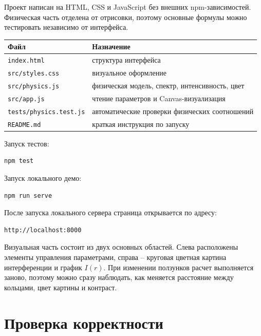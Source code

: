 \documentclass[12pt,a4paper]{article}
\begin{document}
Проект написан на HTML, CSS и JavaScript без внешних npm-зависимостей. Физическая часть отделена от
отрисовки, поэтому основные формулы можно тестировать независимо от интерфейса.

\begin{table}[h]
\centering
\begin{tabular}{ll}
\toprule
Файл & Назначение \\
\midrule
\texttt{index.html} & структура интерфейса \\
\texttt{src/styles.css} & визуальное оформление \\
\texttt{src/physics.js} & физическая модель, спектр, интенсивность, цвет \\
\texttt{src/app.js} & чтение параметров и Canvas-визуализация \\
\texttt{tests/physics.test.js} & автоматические проверки физических соотношений \\
\texttt{README.md} & краткая инструкция по запуску \\
\bottomrule
\end{tabular}
\end{table}

Запуск тестов:
\begin{lstlisting}
npm test
\end{lstlisting}

Запуск локального демо:
\begin{lstlisting}
npm run serve
\end{lstlisting}

После запуска локального сервера страница открывается по адресу:
\begin{lstlisting}
http://localhost:8000
\end{lstlisting}

Визуальная часть состоит из двух основных областей. Слева расположены элементы управления
параметрами, справа -- круговая цветная картина интерференции и график \(I(r)\). При изменении
ползунков расчет выполняется заново, поэтому можно сразу наблюдать, как меняется расстояние между
кольцами, цвет картины и контраст.

\section{Проверка корректности}
\end{document}
